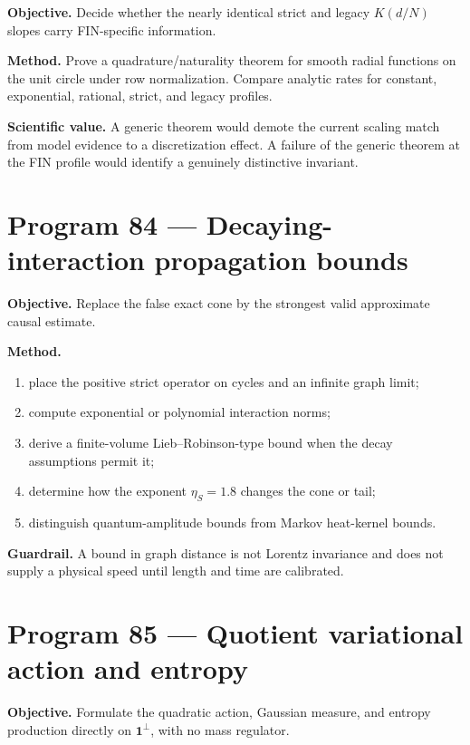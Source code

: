 \documentclass[11pt,a4paper,openany]{report}
\begin{document}
\textbf{Objective.} Decide whether the nearly identical strict and legacy \(K(d/N)\) slopes carry FIN-specific information.

\textbf{Method.} Prove a quadrature/\allowbreak{}naturality theorem for smooth radial functions on the unit circle under row normalization. Compare analytic rates for constant, exponential, rational, strict, and legacy profiles.

\textbf{Scientific value.} A generic theorem would demote the current scaling match from model evidence to a discretization effect. A failure of the generic theorem at the FIN profile would identify a genuinely distinctive invariant.

\section{Program 84 --- Decaying-interaction propagation bounds}

\textbf{Objective.} Replace the false exact cone by the strongest valid approximate causal estimate.

\textbf{Method.}

\begin{enumerate}
\item 
place the positive strict operator on cycles and an infinite graph limit;

\item 
compute exponential or polynomial interaction norms;

\item 
derive a finite-volume Lieb--Robinson-type bound when the decay assumptions permit it;

\item 
determine how the exponent \(\eta_S=1.8\) changes the cone or tail;

\item 
distinguish quantum-amplitude bounds from Markov heat-kernel bounds.

\end{enumerate}

\textbf{Guardrail.} A bound in graph distance is not Lorentz invariance and does not supply a physical speed until length and time are calibrated.

\section{Program 85 --- Quotient variational action and entropy}

\textbf{Objective.} Formulate the quadratic action, Gaussian measure, and entropy production directly on \(\mathbf1^\perp\), with no mass regulator.
\end{document}
